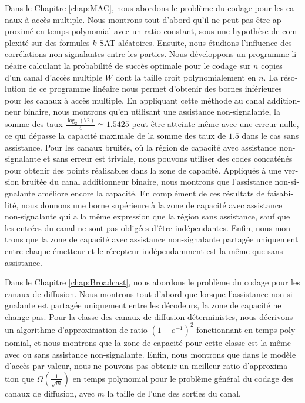 \begin{otherlanguage}{french}
Dans le Chapitre \ref{chap:MAC}, nous abordons le problème du codage pour les canaux à accès multiple. Nous montrons tout d'abord qu'il ne peut pas être approximé en temps polynomial  avec un ratio constant, sous une hypothèse de complexité sur des formules $k$-SAT aléatoires. Ensuite, nous étudions l'influence des corrélations non signalantes entre les parties. Nous développons un programme linéaire calculant la probabilité de succès optimale pour le codage sur $n$ copies d'un canal d'accès multiple $W$ dont la taille croît polynomialement en $n$. La résolution de ce programme linéaire nous permet d'obtenir des bornes inférieures pour les canaux à accès multiple. En appliquant cette méthode au canal additionneur binaire, nous montrons qu'en utilisant une assistance non-signalante, la somme des taux $\frac{\log_2(72)}{4} \simeq 1.5425$ peut être atteinte même avec une erreur nulle, ce qui dépasse la capacité maximale de la somme des taux de $1.5$ dans le cas sans assistance. Pour les canaux bruités, où la région de capacité avec assistance non-signalante et sans erreur est triviale, nous pouvons utiliser des codes concaténés pour obtenir des points réalisables dans la zone de capacité. Appliqués à une version bruitée du canal additionneur binaire, nous montrons que l'assistance non-signalante améliore encore la capacité. En complément de ces résultats de faisabilité, nous donnons une borne supérieure à la zone de capacité avec assistance non-signalante qui a la même expression que la région sans assistance, sauf que les entrées du canal ne sont pas obligées d'être indépendantes. Enfin, nous montrons que la zone de capacité avec assistance non-signalante partagée uniquement entre chaque émetteur et le récepteur indépendamment est la même que sans assistance.

Dans le Chapitre \ref{chap:Broadcast}, nous abordons le problème du codage pour les canaux de diffusion. Nous montrons tout d'abord que lorsque l'assistance non-signalante est partagée uniquement entre les décodeurs, la zone de capacité ne change pas. Pour la classe des canaux de diffusion déterministes, nous décrivons un algorithme d'approximation de ratio $(1-e^{-1})^2$ fonctionnant en temps polynomial, et nous montrons que la zone de capacité pour cette classe est la même avec ou sans assistance non-signalante. Enfin, nous montrons que dans le modèle d'accès par valeur, nous ne pouvons pas obtenir un meilleur ratio d'approximation que $\Omega\left(\frac{1}{\sqrt{m}}\right)$ en temps polynomial pour le problème général du codage des canaux de diffusion, avec $m$ la taille de l'une des sorties du canal.
\end{otherlanguage}
